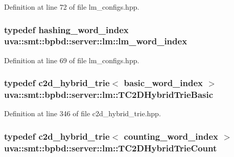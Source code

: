 Definition at line 72 of file lm\+\_\+configs.\+hpp.

\hypertarget{namespaceuva_1_1smt_1_1bpbd_1_1server_1_1lm_a023e38a6fe02511f8c3c806784c2a5f2}{}
\subsubsection[{lm\+\_\+word\+\_\+index}]{\setlength{\rightskip}{0pt plus 5cm}typedef {\bf hashing\+\_\+word\+\_\+index} {\bf uva\+::smt\+::bpbd\+::server\+::lm\+::lm\+\_\+word\+\_\+index}}\label{namespaceuva_1_1smt_1_1bpbd_1_1server_1_1lm_a023e38a6fe02511f8c3c806784c2a5f2}


Definition at line 69 of file lm\+\_\+configs.\+hpp.

\hypertarget{namespaceuva_1_1smt_1_1bpbd_1_1server_1_1lm_aa8635ba03284cbec1c3c4624be585843}{}
\subsubsection[{T\+C2\+D\+Hybrid\+Trie\+Basic}]{\setlength{\rightskip}{0pt plus 5cm}typedef {\bf c2d\+\_\+hybrid\+\_\+trie}$<$ {\bf basic\+\_\+word\+\_\+index} $>$ {\bf uva\+::smt\+::bpbd\+::server\+::lm\+::\+T\+C2\+D\+Hybrid\+Trie\+Basic}}\label{namespaceuva_1_1smt_1_1bpbd_1_1server_1_1lm_aa8635ba03284cbec1c3c4624be585843}


Definition at line 346 of file c2d\+\_\+hybrid\+\_\+trie.\+hpp.

\hypertarget{namespaceuva_1_1smt_1_1bpbd_1_1server_1_1lm_a3ec9e9d13b9d4113be8a17daff17f9fe}{}
\subsubsection[{T\+C2\+D\+Hybrid\+Trie\+Count}]{\setlength{\rightskip}{0pt plus 5cm}typedef {\bf c2d\+\_\+hybrid\+\_\+trie}$<$ {\bf counting\+\_\+word\+\_\+index} $>$ {\bf uva\+::smt\+::bpbd\+::server\+::lm\+::\+T\+C2\+D\+Hybrid\+Trie\+Count}}\label{namespaceuva_1_1smt_1_1bpbd_1_1server_1_1lm_a3ec9e9d13b9d4113be8a17daff17f9fe}


